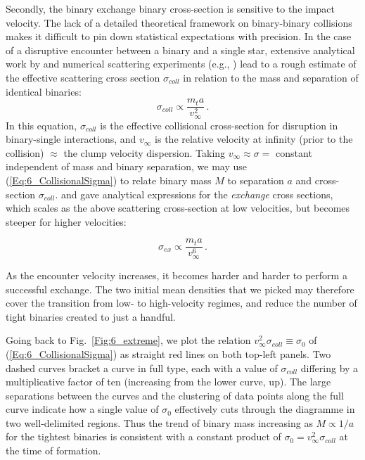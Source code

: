Secondly, the binary exchange binary cross-section is sensitive to the impact velocity. The lack of a detailed theoretical framework on binary-binary collisions makes it difficult to pin down statistical expectations with precision. In the case of a disruptive encounter between a binary and a single star, extensive 
analytical work by \cite{Mikkola1983,Mikkola1984a,Mikkola1984b} and numerical scattering experiments (e.g., \citealt{Heggie1996,Fregeau2004}) lead to a rough estimate of the effective scattering cross section $\sigma_{coll}$ in relation to the mass and separation of identical binaries: 
\begin{equation}
\sigma_{coll} \propto \frac{m_t a}{v_\infty^2}\, . 
\label{Eq:6_CollisionalSigma} 
\end{equation}
In this equation, $\sigma_{coll}$ is the effective collisional cross-section for disruption in binary-single  interactions, and $v_\infty$ is the relative velocity at infinity (prior to the collision) $\approx $ the clump velocity dispersion. Taking $ v_\infty \approx \sigma = $ constant independent of mass and binary separation, we may use (\ref{Eq:6_CollisionalSigma}) to relate binary mass $M$ to separation $a$ and  cross-section $\sigma_{coll}$. \cite{Hut1983} and \cite{Hut1983b} gave analytical expressions for the \textit{exchange} cross sections, which scales as the above scattering cross-section at low velocities, but becomes steeper for higher velocities:

\begin{equation}
\sigma_{ex} \propto \frac{m_t a}{v_\infty^6}\, . 
\label{Eq:6_ExchangeSigma} 
\end{equation}
  
As the encounter velocity increases, it becomes harder and harder to perform a successful exchange. The two initial mean 
densities that we picked may therefore cover the transition from low- to high-velocity regimes, and reduce the number of tight binaries created to just a handful. 

Going back to Fig.~\ref{Fig:6_extreme}, we plot the relation $v^2_\infty \sigma_{coll} \equiv \sigma_0$ of (\ref{Eq:6_CollisionalSigma}) as straight red lines on both top-left panels. Two dashed curves bracket a curve in full type, each with a value of  $\sigma_{coll}$ differing by a multiplicative factor of ten (increasing from the lower curve, up).  The large separations between the curves and the clustering of data points along the full curve indicate how a single value of $\sigma_0$ effectively cuts through the diagramme in two well-delimited regions.  
Thus the trend of binary mass increasing as $M \propto 1/a$ for the tightest binaries is consistent with a constant product of $\sigma_0 = v^2_\infty \sigma_{coll}$ at the time of formation. 

